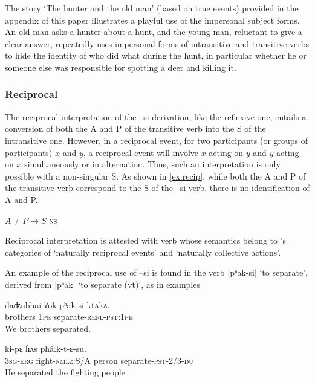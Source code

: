 \documentclass[twoside,a4paper,11pt]{article}
\newcommand{\ipa}[1]{{\phon#1}}
\begin{document}
The story `The hunter and the old man' (based on true events) provided in the appendix of this paper illustrates a playful use of the impersonal subject forms. An old man asks a hunter about a hunt, and the young man, reluctant to give a clear answer, repeatedly uses impersonal forms of intransitive and transitive verbs to hide the identity of who did what during the hunt, in particular whether he or someone else was responsible for spotting a deer and killing it.

\subsubsection{Reciprocal}
The reciprocal  interpretation of the \ipa{--si} derivation, like the reflexive one, entails a conversion of both the A and P of the transitive verb into the S of the intransitive one. However, in a reciprocal event, for two participants (or groups of participants) $x$ and $y$, a reciprocal event will involve $x$ acting on $y$ and $y$  acting on $x$ simultaneously or in alternation.  Thus, such an interpretation is only possible with a non-singular S. As shown in \ref{ex:recip}, while both the A and P of the transitive verb correspond to the S of the  \ipa{--si} verb, there is no identification of A and P.

 \begin{exe}
\ex \label{ex:recip}
\glt $A \neq P  \rightarrow S$ \textsc{ns}

\end{exe}

Reciprocal interpretation is attested with verb whose semantics belong to \citet{kemmer93middle}'s categories of `naturally reciprocal events' and `naturally collective actions'.


An example of the reciprocal use of \ipa{--si} is found in the verb |\ipa{pʰak-si}| `to separate', derived from |\ipa{pʰak}| `to separate (vt)', as in examples 


\begin{exe}
\ex 
\gll 
\ipa{daʣubhai}  	\ipa{ʔok}  	\ipa{pʰak-si-ktʌkʌ.}  \\
brothers \textsc{1pe} separate-\textsc{refl-pst:1pe} \\
\glt We brothers separated.
\end{exe}

\begin{exe}
\ex 
\gll \ipa{ʔʌ̄m-ʔɛ} 	\ipa{ki-pɛ} 	\ipa{ɦʌs} 	\ipa{phâːk-t-ɛ-su.} \\ 
\textsc{3sg-erg} fight-\textsc{nmlz}:S/A person separate-\textsc{pst}-2/3-\textsc{du} \\
\glt He separated the fighting people.
\end{exe}
\end{document}
